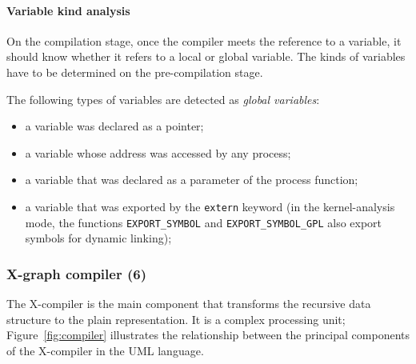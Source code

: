 

\paragraph{Variable kind analysis}
\label{ch:impl:proc:x-pre-compiler:var}

On the compilation stage, once the compiler meets the reference to a variable, it should know whether it refers to a local or global variable.
The kinds of variables have to be determined on the pre-compilation stage.

The following types of variables are detected as \textit{global variables}:
\begin{itemize}
\item a variable was declared as a pointer;
\item a variable whose address was accessed by any process;
\item a variable that was declared as a parameter of the process function;
\item a variable that was exported by the \texttt{extern} keyword (in the kernel-analysis mode, the functions \texttt{EXPORT\_SYMBOL} and \texttt{EXPORT\_SYMBOL\_GPL} also export symbols for dynamic linking); %
\end{itemize}


\subsubsection{X-graph compiler (6)}
\label{ch:impl:proc:x-compiler}

The X-compiler is the main component that transforms the recursive \ytree{} data structure to the plain \xgraph{} representation.
It is a complex processing unit; Figure~\ref{fig:compiler} illustrates the relationship between the principal components of the X-compiler in the UML language.

